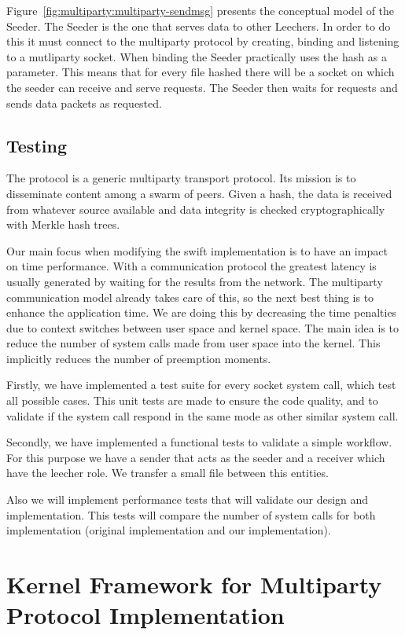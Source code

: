 Figure~\ref{fig:multiparty:multiparty-sendmsg} presents the conceptual model
of the Seeder. The Seeder is the one that serves data to other Leechers. In
order to do this it must connect to the multiparty protocol by creating,
binding and listening to a mutliparty socket. When binding the Seeder
practically uses the hash as a parameter. This means that for every file
hashed there will be a socket on which the seeder can receive and serve
requests. The Seeder then waits for requests and sends data packets as
requested.

\subsection{Testing}

The  protocol is a generic multiparty transport protocol. Its mission is to
disseminate content among a swarm of peers.  Given a hash, the data is
received from whatever source available and data integrity is checked
cryptographically with Merkle hash trees. 

Our main focus when modifying the swift implementation is to have an impact on
time performance. With a communication protocol the greatest latency is
usually generated by waiting for the results from the network. The multiparty
communication model already takes care of this, so the next best thing is to
enhance the application time. We are doing this by decreasing the time
penalties due to context switches between user space and kernel space. The
main idea is to reduce the number of system calls made from user space into
the kernel. This implicitly reduces the number of preemption moments.

Firstly, we have implemented a test suite for every socket system call, which
test all possible cases.  This unit tests are made to ensure the code quality,
and to validate if the system call respond in the same mode as other similar
system call.

Secondly, we have implemented a functional tests to validate a simple
workflow. For this purpose we have a sender that acts as the seeder and a
receiver which have the leecher role. We transfer a small file between this
entities.

Also we will implement performance tests that will validate our design and
implementation. This tests will compare the number of system calls for both
implementation (original implementation and our implementation).

\section{Kernel Framework for Multiparty Protocol Implementation}
\label{sec:multiparty:kernel-framework}

